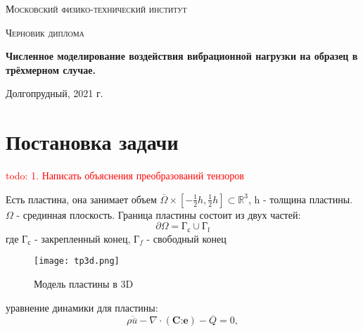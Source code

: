 \documentclass[a4paper,12pt]{article}
\begin{document}
\begin{titlepage}
	\centering
	\vspace{5cm}
	{\scshape\LARGE Московский физико-технический институт \par}
	\vspace{4cm}
	{\scshape\Large Черновик диплома \par}
	\vspace{1cm}
        
           	{\huge\bfseries  Численное моделирование воздействия вибрационной нагрузки на образец в трёхмерном случае. \par} 
        

	\vspace{1cm}
	\vfill
\begin{flushright}
	{\Large }\par
	\vspace{0.3cm}
	{\large  \par
                 
 } \par

\end{flushright}
	

	\vfill

	Долгопрудный, 2021 г.
\end{titlepage}


\section{Постановка задачи}
\textcolor{red}{todo:
1. Написать объяснения преобразований тензоров} \par
Есть пластина, она занимает объем $\overline{\Omega} \times [-\frac{1}{2}h, \frac{1}{2}h] \subset \mathbb{R}^3$, h - толщина пластины. $\Omega$ - срединная плоскость. Граница пластины состоит из двух частей:
\begin{equation}
    \partial \Omega = \text{Г}_{\text{с}} \cup \text{Г}_{\text{f}}
\end{equation}
где $\text{Г}_{\text{с}}$ - закрепленный конец, $\text{Г}_f$ - свободный конец
\begin{figure}[H]
	\begin{center}
		\texttt{[image: tp3d.png]}
		\caption{Модель пластины в 3D}
	\end{center}
\end{figure}


уравнение динамики для пластины: 
\begin{equation}
\rho\ddot{\overline{u}} -  \nabla \cdot ( \textbf{C:e}) - \overline{Q} = 0,
\end{equation}
\end{document}
